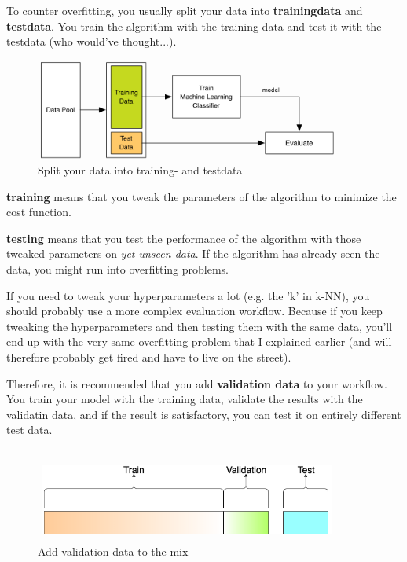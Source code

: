 \documentclass[a4paper, 11pt]{article}
\begin{document}
To counter overfitting, you usually split your data into \textbf{trainingdata} and \textbf{testdata}. You train the algorithm with the training data and test it with the testdata (who would've thought...). 

\begin{figure}[htb!]
    \centering
    \includegraphics[keepaspectratio=true,width=0.9\textwidth]{training_testdata.png}
    \caption{Split your data into training- and testdata}
    \label{fig:training_testdata}
\end{figure}

\textbf{training} means that you tweak the parameters of the algorithm to minimize the cost function.

\textbf{testing} means that you test the performance of the algorithm with those tweaked parameters on \textit{yet unseen data}. If the algorithm has already seen the data, you might run into overfitting problems.

\vspace{10px}

If you need to tweak your hyperparameters a lot (e.g. the 'k' in k-NN), you should probably use a more complex evaluation workflow. Because if you keep tweaking the hyperparameters and then testing them with the same data, you'll end up with the very same overfitting problem that I explained earlier (and will therefore probably get fired and have to live on the street).

\vspace{10px}

Therefore, it is recommended that you add \textbf{validation data} to your workflow. You train your model with the training data, validate the results with the validatin data, and if the result is satisfactory, you can test it on entirely different test data.

\begin{figure}[htb!]
    \centering
    \includegraphics[keepaspectratio=true,width=0.9\textwidth]{validation_data.png}
    \caption{Add validation data to the mix}
    \label{fig:validation_data}
\end{figure}
\end{document}
